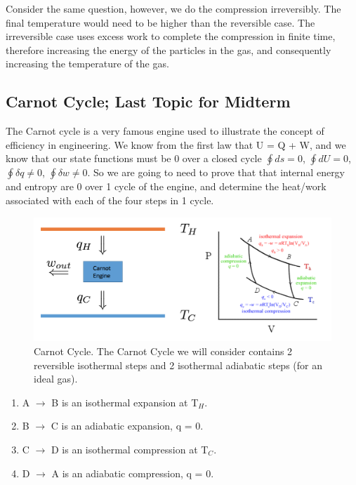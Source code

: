 \documentclass{article}
\begin{document}
Consider the same question, however, we do the compression irreversibly. 
The final temperature would need to be higher than the reversible case. 
The irreversible case uses excess work to complete the compression in finite time, therefore increasing the energy of the particles in the gas, and consequently increasing the temperature of the gas. 

\subsection*{Carnot Cycle; Last Topic for Midterm}
The Carnot cycle is a very famous engine used to illustrate the concept of efficiency in engineering. 
We know from the first law that U = Q + W, and we know that our state functions must be 0 over a closed cycle $\oint ds = 0$, $\oint dU = 0$, $\oint \delta q \neq 0$, $\oint \delta w \neq 0$.
So we are going to need to prove that that internal energy and entropy are 0 over 1 cycle of the engine, and determine the heat/work associated with each of the four steps in 1 cycle. 

\begin{figure}[H]
    \centering
    \includegraphics[width=17cm]{carnot.png}
    \caption{Carnot Cycle. The Carnot Cycle we will consider contains 2 reversible isothermal steps and 2 isothermal adiabatic steps (for an ideal gas).}
    \label{fig:carnot}
\end{figure}

\begin{enumerate}
    \item A $\rightarrow$ B is an isothermal expansion at T$_H$. 
    \item B $\rightarrow$ C is an adiabatic expansion, q = 0. 
    \item C $\rightarrow$ D is an isothermal compression at T$_C$. 
    \item D $\rightarrow$ A is an adiabatic compression, q = 0.     
\end{enumerate}
\end{document}

